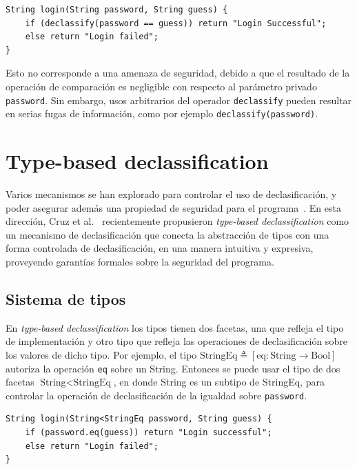 \clearpage

\begin{lstlisting}
String login(String password, String guess) {
	if (declassify(password == guess)) return "Login Successful";
	else return "Login failed";
}
\end{lstlisting}

	Esto no corresponde a una amenaza de seguridad, debido a que el resultado de la operación de comparación es negligible con respecto al parámetro privado \texttt{password}. Sin embargo, usos arbitrarios del operador \texttt{declassify} pueden resultar en serias fugas de información, como por ejemplo \texttt{declassify(password)}.

	\section{Type-based declassification}

	Varios mecanismos se han explorado para controlar el uso de declasificación, y poder asegurar además una propiedad de seguridad para el programa~\cite{sabelfeldSands:JCS09}. En esta dirección, Cruz et al.~\cite{cruzAl:ecoop2017} recientemente propusieron \textit{type-based declassification} como un mecanismo de declasificación que conecta la abstracción de tipos con una forma controlada de declasificación, en una manera intuitiva y expresiva, proveyendo garantías formales sobre la seguridad del programa. %

	\subsection{Sistema de tipos}

	En \textit{type-based declassification} los tipos tienen dos facetas, una que refleja el tipo de implementación y otro tipo que refleja las operaciones de declasificación sobre los valores de dicho tipo. Por ejemplo, el tipo $\text{StringEq} \triangleq [\text{eq} : \text{String} \rightarrow \text{Bool}]$ autoriza la operación \texttt{eq} sobre un String. Entonces se puede usar el tipo de dos facetas $\text{String} < \text{StringEq}$, en donde String es un subtipo de StringEq, para controlar la operación de declasificación de la igualdad sobre \texttt{password}.

	\begin{lstlisting}
String login(String<StringEq password, String guess) {
	if (password.eq(guess)) return "Login successful";
	else return "Login failed";
}
	\end{lstlisting}

